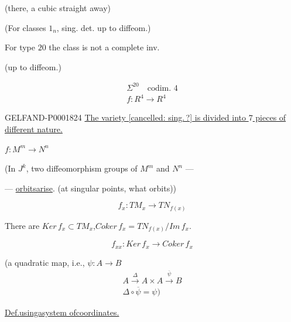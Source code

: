 (there, a cubic straight away)

(For classes $1_n$, sing. det. up to diffeom.)

For type $20$ the class is not a complete inv.

(up to diffeom.)

\begin{gather*}\Sigma^{20}\quad\text{codim. }4\\f: R^4\longrightarrow R^4\end{gather*}

\begin{GelfandAdjacentEvidence}{GELFAND-P000182}{4}
\uline{The variety [cancelled: sing.\,?] is divided into $7$ pieces of different nature.}
\end{GelfandAdjacentEvidence}

\quad{}\quad{}

$f: M^m\longrightarrow N^n$

(In $J^k$, two diffeomorphism groups of $M^m$ and $N^n$ —

— \underline{orbits}\quad\underline{arise}. (at singular points, what orbits))

\begin{equation*}f_x: TM_x\longrightarrow TN_{f (x)}\end{equation*}

There are $Ker\, f_x\subset TM_x$,\qquad $Coker\, f_x=TN_{f (x)}/Im\, f_x$.

\begin{equation*}f_{xx}: Ker\, f_x\longrightarrow Coker\, f_x\end{equation*}

(a quadratic map, i.e., $\psi: A\longrightarrow B$
\begin{gather*}
A\overset{\Delta}{\longrightarrow}A\times A\overset{\overline\psi}{\longrightarrow}B\\
\Delta\circ\overline\psi=\psi)
\end{gather*}

\uline{Def.}\quad\uline{using}\quad\uline{a}\quad\uline{system of}\quad\uline{coordinates.}




